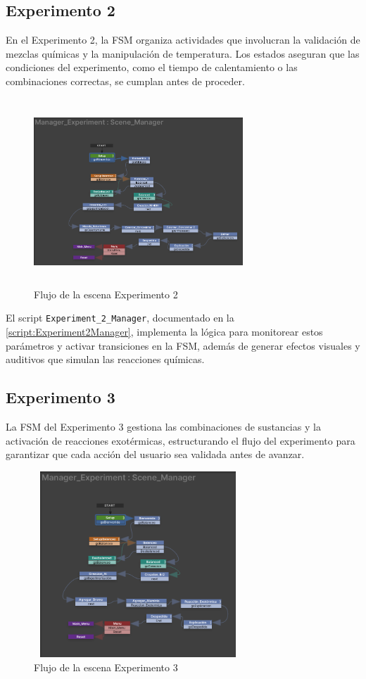 \subsection{Experimento 2}
En el Experimento 2, la FSM organiza actividades que involucran la validación de mezclas químicas y la manipulación de temperatura. Los estados aseguran que las condiciones del experimento, como el tiempo de calentamiento o las combinaciones correctas, se cumplan antes de proceder.
\begin{figure}[thbp]
    \centering
    \includegraphics[width=0.7\textwidth, height = 7cm]{img/chapter05/Experimento_02.png}
    \caption{Flujo de la escena Experimento 2}
    \label{fig:FSM_E2}
\end{figure}

El script \texttt{Experiment\_2\_Manager}, documentado en la \autoref{script:Experiment2Manager}, implementa la lógica para monitorear estos parámetros y activar transiciones en la FSM, además de generar efectos visuales y auditivos que simulan las reacciones químicas.

\subsection{Experimento 3}
La FSM del Experimento 3 gestiona las combinaciones de sustancias y la activación de reacciones exotérmicas, estructurando el flujo del experimento para garantizar que cada acción del usuario sea validada antes de avanzar.
\begin{figure}[thbp]
    \centering
    \includegraphics[width=0.7\textwidth, height = 7cm]{img/chapter05/Experimento_03.png}
    \caption{Flujo de la escena Experimento 3}
    \label{fig:FSM_E3}
\end{figure}

